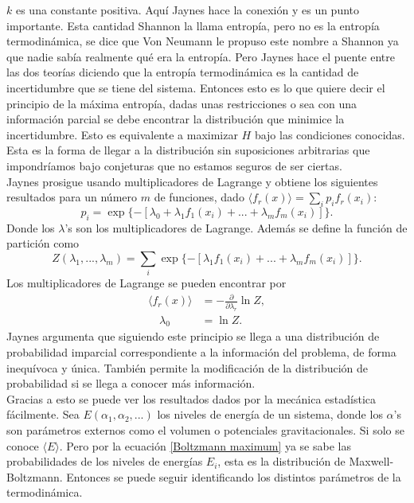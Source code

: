 $k$ es una constante positiva. Aquí Jaynes hace la conexión y es un punto importante. Esta cantidad Shannon la llama entropía, pero no es la entropía termodinámica, se dice que Von Neumann le propuso este nombre a Shannon ya que nadie sabía realmente qué era la entropía. Pero Jaynes hace el puente entre las dos teorías diciendo que la entropía termodinámica es la cantidad de incertidumbre que se tiene del sistema. Entonces esto es lo que quiere decir el principio de la máxima entropía, dadas unas restricciones o sea con una información parcial se debe encontrar la distribución que minimice la incertidumbre. Esto es equivalente a maximizar $H$ bajo las condiciones conocidas. Esta es la forma de llegar a la distribución sin suposiciones arbitrarias que impondríamos bajo conjeturas que no estamos seguros de ser ciertas.
\\
Jaynes prosigue usando multiplicadores de Lagrange y obtiene los siguientes resultados para un número $m$ de funciones, dado  $\langle f_{r}(x) \rangle = \sum_{i} p_{i} f_{r} (x_{i})$:
\begin{equation} \label{Boltzmann maximum}
p_{i}= \exp \{ -[\lambda_{0}+ \lambda_{1}f_{1}(x_{i})+...+\lambda_{m} f_{m}(x_{i})] \}.
\end{equation}
Donde los $\lambda$'s son los multiplicadores de Lagrange. Además se define la función de partición como
\begin{equation}
Z(\lambda_{1},...,\lambda_{m})=\sum_{i} \exp \{ -[ \lambda_{1}f_{1}(x_{i})+...+\lambda_{m} f_{m}(x_{i})] \}.
\end{equation}
Los multiplicadores de Lagrange se pueden encontrar por
\begin{align*}
\langle f_{r}(x) \rangle  &= - \frac{\partial}{\partial \lambda_{r}} \ln Z, \\
\quad \lambda_{0} &= \ln Z.
\end{align*}
Jaynes argumenta que siguiendo este principio se llega a una distribución de probabilidad imparcial correspondiente a la información del problema, de forma inequívoca y única. También permite la modificación de la distribución de probabilidad si se llega a conocer más información.
\\
Gracias a esto se puede ver los resultados dados por la mecánica estadística fácilmente. Sea $E(\alpha_{1},\alpha_{2},...)$ los niveles de energía de un sistema, donde los $\alpha$'s son parámetros externos como el volumen o potenciales gravitacionales. Si solo se conoce $\langle E \rangle $. Pero por la ecuación \ref{Boltzmann maximum} ya se sabe las probabilidades de los niveles de energías $E_{i}$, esta es la distribución de Maxwell-Boltzmann. Entonces se puede seguir identificando los distintos parámetros de la termodinámica.
